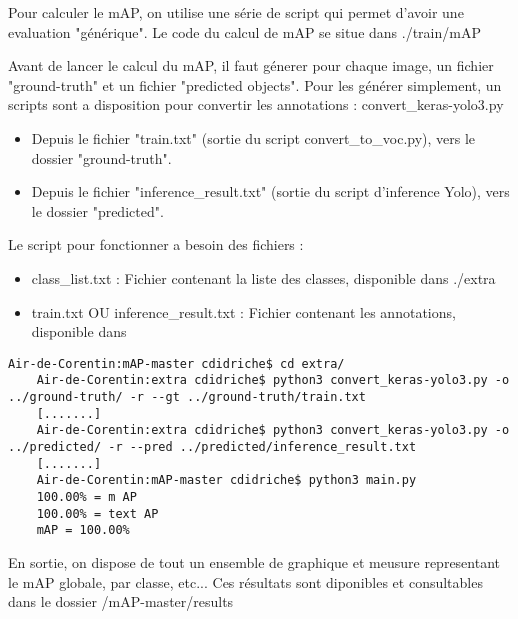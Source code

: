Pour calculer le mAP, on utilise une série de script qui permet d'avoir une evaluation "générique".
Le code du calcul de mAP se situe dans ./train/mAP

Avant de lancer le calcul du mAP, il faut génerer pour chaque image, un fichier "ground-truth" et un fichier "predicted objects".
Pour les générer simplement, un scripts sont a disposition pour convertir les annotations : convert_keras-yolo3.py
\begin{itemize}
    \item Depuis le fichier "train.txt" (sortie du script convert_to_voc.py), vers le dossier "ground-truth".
    \item Depuis le fichier "inference_result.txt" (sortie du script d'inference Yolo), vers le dossier "predicted".
\end{itemize}

Le script pour fonctionner a besoin des fichiers :
\begin{itemize}
    \item class_list.txt : Fichier contenant la liste des classes, disponible dans ./extra
    \item train.txt OU inference_result.txt : Fichier contenant les annotations, disponible dans
\end{itemize}

\begin{lstlisting}[style=console]
    Air-de-Corentin:mAP-master cdidriche$ cd extra/
    Air-de-Corentin:extra cdidriche$ python3 convert_keras-yolo3.py -o ../ground-truth/ -r --gt ../ground-truth/train.txt
    [.......]
    Air-de-Corentin:extra cdidriche$ python3 convert_keras-yolo3.py -o ../predicted/ -r --pred ../predicted/inference_result.txt
    [.......]
    Air-de-Corentin:mAP-master cdidriche$ python3 main.py
    100.00% = m AP
    100.00% = text AP
    mAP = 100.00%
\end{lstlisting}

En sortie, on dispose de tout un ensemble de graphique et meusure representant le mAP globale, par classe, etc...
Ces résultats sont diponibles et consultables dans le dossier /mAP-master/results
